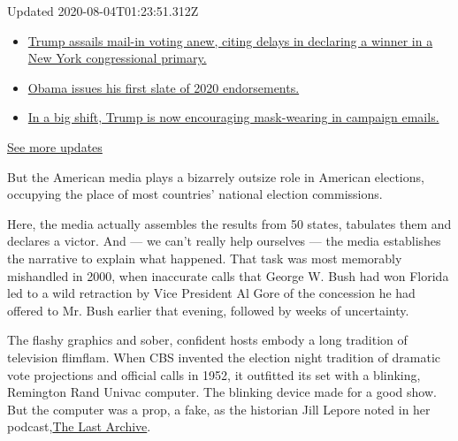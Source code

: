Updated 2020-08-04T01:23:51.312Z

\begin{itemize}
\tightlist
\item
  \href{https://www.nytimes3xbfgragh.onion/2020/08/03/us/elections/biden-vs-trump.html?action=click\&pgtype=Article\&state=default\&region=MAIN_CONTENT_1\&context=storylines_live_updates\#link-6494b448}{Trump
  assails mail-in voting anew, citing delays in declaring a winner in a
  New York congressional primary.}
\item
  \href{https://www.nytimes3xbfgragh.onion/2020/08/03/us/elections/biden-vs-trump.html?action=click\&pgtype=Article\&state=default\&region=MAIN_CONTENT_1\&context=storylines_live_updates\#link-3de249e6}{Obama
  issues his first slate of 2020 endorsements.}
\item
  \href{https://www.nytimes3xbfgragh.onion/2020/08/03/us/elections/biden-vs-trump.html?action=click\&pgtype=Article\&state=default\&region=MAIN_CONTENT_1\&context=storylines_live_updates\#link-54e34d20}{In
  a big shift, Trump is now encouraging mask-wearing in campaign
  emails.}
\end{itemize}

\href{https://www.nytimes3xbfgragh.onion/2020/08/03/us/elections/biden-vs-trump.html?action=click\&pgtype=Article\&state=default\&region=MAIN_CONTENT_1\&context=storylines_live_updates}{See
more updates}

But the American media plays a bizarrely outsize role in American
elections, occupying the place of most countries' national election
commissions.

Here, the media actually assembles the results from 50 states, tabulates
them and declares a victor. And --- we can't really help ourselves ---
the media establishes the narrative to explain what happened. That task
was most memorably mishandled in 2000, when inaccurate calls that George
W. Bush had won Florida led to a wild retraction by Vice President Al
Gore of the concession he had offered to Mr. Bush earlier that evening,
followed by weeks of uncertainty.

The flashy graphics and sober, confident hosts embody a long tradition
of television flimflam. When CBS invented the election night tradition
of dramatic vote projections and official calls in 1952, it outfitted
its set with a blinking, Remington Rand Univac computer. The blinking
device made for a good show. But the computer was a prop, a fake, as the
historian Jill Lepore noted in her
podcast,\href{https://www.thelastarchive.com/}{The Last Archive}.

